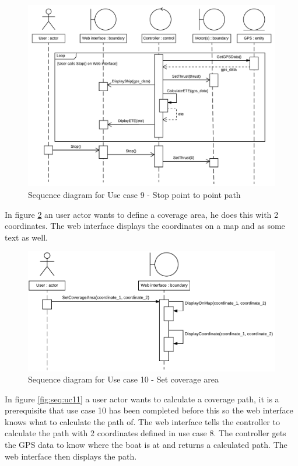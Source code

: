 \begin{figure}[H]
	\centering
	\includegraphics[width=1\linewidth]{Images/System_architecture/Use_case_9_SD}
	\caption{Sequence diagram for Use case 9 - Stop point to point path}
	\label{fig:seq:uc9}
\end{figure}

In figure \ref{fig:seq:uc10} an user actor wants to define a coverage area, he does this with 2 coordinates. The web interface displays the coordinates on a map and as some text as well. 

\begin{figure}[H]
	\centering
	\includegraphics[width=1\linewidth]{Images/System_architecture/Use_case_10_SD}
	\caption{Sequence diagram for Use case 10 - Set coverage area}
	\label{fig:seq:uc10}
\end{figure}

In figure \ref{fig:seq:uc11} a user actor wants to calculate a coverage path, it is a prerequisite that use case 10 has been completed before this so the web interface knows what to calculate the path of. The web interface tells the controller to calculate the path with 2 coordinates defined in use case 8. The controller gets the GPS data to know where the boat is at and returns a calculated path. The web interface then displays the path.

